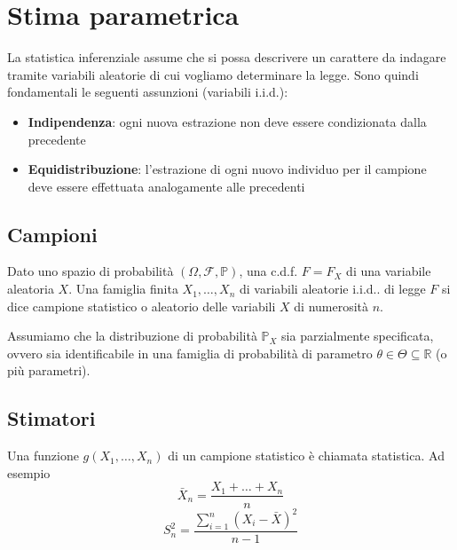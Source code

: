 \newpage
\section{Stima parametrica}
La statistica inferenziale assume che si possa descrivere un carattere da indagare tramite variabili aleatorie di cui vogliamo determinare la legge. Sono quindi fondamentali le seguenti assunzioni (variabili i.i.d.):
\begin{itemize}
	\item \textbf{Indipendenza}: ogni nuova estrazione non deve essere condizionata dalla precedente
	\item \textbf{Equidistribuzione}: l'estrazione di ogni nuovo individuo per il campione deve essere effettuata analogamente alle precedenti
\end{itemize}

\subsection{Campioni}
\begin{definition}
	Dato uno spazio di probabilità $(\Omega, \mathcal{F}, \mathbb{P})$, una c.d.f. $F=F_X$ di una variabile aleatoria $X$. Una famiglia finita $X_1, \ldots, X_n$ di variabili aleatorie i.i.d.. di legge $F$ si dice campione statistico o aleatorio delle variabili $X$ di numerosità $n$. 
\end{definition}
\begin{observation}
	Assumiamo che la distribuzione di probabilità $\mathbb{P}_X$ sia parzialmente specificata, ovvero sia identificabile in una famiglia di probabilità di parametro $\theta \in \Theta \subseteq \mathbb{R}$ (o più parametri).
\end{observation}

\subsection{Stimatori}
\begin{definition}
	Una funzione $g(X_1, \ldots, X_n)$ di un campione statistico è chiamata statistica. Ad esempio
	\begin{equation}
		\bar{X}_n = \frac{X_1 + \ldots + X_n}{n} \tag{Media campionaria}
	\end{equation}
	\begin{equation}
		\label{eq:varcamp}
		S^2_n = \frac{\sum_{i=1}^{n}(X_i-\bar{X})^2}{n-1} \tag{Varianza campionaria}
	\end{equation}
\end{definition}

